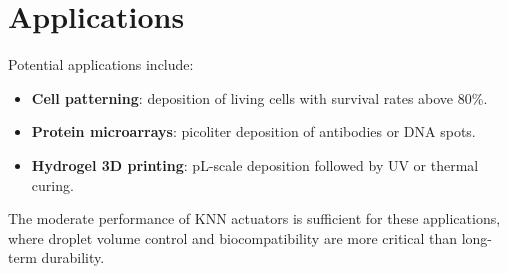 \section{Applications}
Potential applications include:
\begin{itemize}
  \item \textbf{Cell patterning}: deposition of living cells with survival rates above 80\%.
  \item \textbf{Protein microarrays}: picoliter deposition of antibodies or DNA spots.
  \item \textbf{Hydrogel 3D printing}: pL-scale deposition followed by UV or thermal curing.
\end{itemize}

The moderate performance of KNN actuators is sufficient for these
applications, where droplet volume control and biocompatibility are
more critical than long-term durability.
